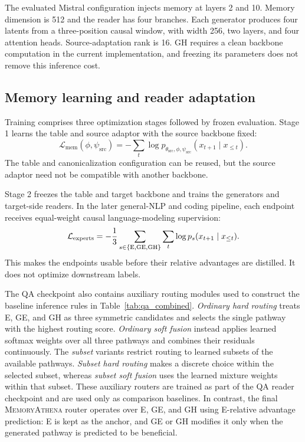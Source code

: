 The evaluated Mistral configuration injects memory at layers 2 and 10. Memory dimension is 512 and the reader has four branches. Each generator produces four latents from a three-position causal window, with width 256, two layers, and four attention heads. Source-adaptation rank is 16. GH requires a clean backbone computation in the current implementation, and freezing its parameters does not remove this inference cost.

\subsection{Memory learning and reader adaptation}

Training comprises three optimization stages followed by frozen evaluation. Stage 1 learns the table and source adaptor with the source backbone fixed:
\begin{equation}
 \mathcal L_{\mathrm{mem}}(\phi,\psi_{\mathrm{src}})
 =-\sum_t\log p_{\theta_{\mathrm{src}},\phi,\psi_{\mathrm{src}}}
 (x_{t+1}\mid x_{\leq t}).
 \label{eq:memloss}
\end{equation}
The table and canonicalization configuration can be reused, but the source adaptor need not be compatible with another backbone.

Stage 2 freezes the table and target backbone and trains the generators and target-side readers. In the later general-NLP and coding pipeline, each endpoint receives equal-weight causal language-modeling supervision:
\begin{equation}
 \mathcal L_{\mathrm{experts}}
 =-\frac13\sum_{s\in\{\mathrm{E},\mathrm{GE},\mathrm{GH}\}}\sum_t
 \log p_s(x_{t+1}\mid x_{\leq t}).
 \label{eq:expertloss}
\end{equation}
This makes the endpoints usable before their relative advantages are distilled. It does not optimize downstream labels.

The QA checkpoint also contains auxiliary routing modules used to construct the
baseline inference rules in Table~\ref{tab:qa_combined}.
\emph{Ordinary hard routing} treats E, GE, and GH as three symmetric candidates
and selects the single pathway with the highest routing score.
\emph{Ordinary soft fusion} instead applies learned softmax weights over all
three pathways and combines their residuals continuously.
The \emph{subset} variants restrict routing to learned subsets of the available
pathways. \emph{Subset hard routing} makes a discrete choice within the selected
subset, whereas \emph{subset soft fusion} uses the learned mixture weights
within that subset.
These auxiliary routers are trained as part of the QA reader checkpoint and are
used only as comparison baselines. In contrast, the final
\textsc{MemoryAthena} router operates over E, GE, and GH using E-relative
advantage prediction: E is kept as the anchor, and GE or GH modifies it only
when the generated pathway is predicted to be beneficial.

